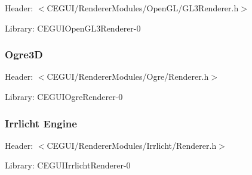 \begin{DoxyItemize}
\item Header\+: $<$C\+E\+G\+U\+I/\+Renderer\+Modules/\+Open\+G\+L/\+G\+L3\+Renderer.\+h$>$
\item Library\+: C\+E\+G\+U\+I\+Open\+G\+L3\+Renderer-\/0 
\begin{DoxyCode}{0}
\DoxyCodeLine{\textcolor{comment}{// Create an OpenGL3Renderer object that uses the current GL viewport as}}
\DoxyCodeLine{\textcolor{comment}{// the default output surface.}}
\end{DoxyCode}

\end{DoxyItemize}\hypertarget{rendering_tutorial_rendering_tutorial_renderer_ogre}{}\subsubsection{Ogre3D}\label{rendering_tutorial_rendering_tutorial_renderer_ogre}

\begin{DoxyItemize}
\item Header\+: $<$C\+E\+G\+U\+I/\+Renderer\+Modules/\+Ogre/\+Renderer.\+h$>$
\item Library\+: C\+E\+G\+U\+I\+Ogre\+Renderer-\/0 
\begin{DoxyCode}{0}
\DoxyCodeLine{\textcolor{comment}{// Create an OgreRenderer object that uses the default Ogre rendering}}
\DoxyCodeLine{\textcolor{comment}{// window as the default output surface.}}
\end{DoxyCode}

\end{DoxyItemize}\hypertarget{rendering_tutorial_rendering_tutorial_renderer_irrlicht}{}\subsubsection{Irrlicht Engine}\label{rendering_tutorial_rendering_tutorial_renderer_irrlicht}

\begin{DoxyItemize}
\item Header\+: $<$C\+E\+G\+U\+I/\+Renderer\+Modules/\+Irrlicht/\+Renderer.\+h$>$
\item Library\+: C\+E\+G\+U\+I\+Irrlicht\+Renderer-\/0 
\begin{DoxyCode}{0}
\end{DoxyCode}

\end{DoxyItemize}

